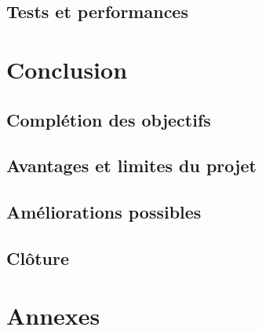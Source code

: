 \documentclass[a4paper, 12pt]{report}
\begin{document}
    \section{Tests et performances}

\chapter{Conclusion}
\minitoc
{}
\clearpage
    \section{Complétion des objectifs}
    \section{Avantages et limites du projet}
    \section{Améliorations possibles}
    \section{Clôture}

\chapter{Annexes}
\minitoc
{}
\clearpage            

\appendix
\end{document}
